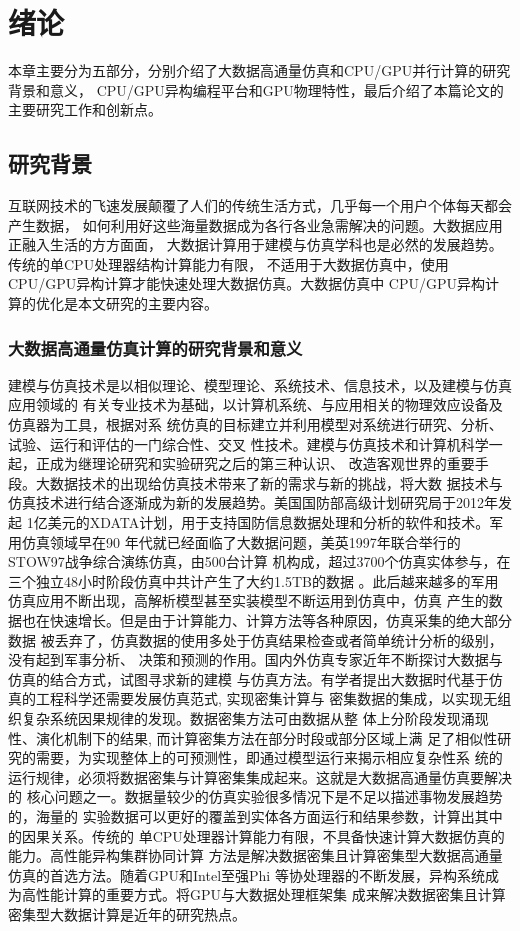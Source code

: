 \chapter{绪论}
本章主要分为五部分，分别介绍了大数据高通量仿真和CPU/GPU并行计算的研究背景和意义，
CPU/GPU异构编程平台和GPU物理特性，最后介绍了本篇论文的主要研究工作和创新点。

\section{研究背景}
互联网技术的飞速发展颠覆了人们的传统生活方式，几乎每一个用户个体每天都会产生数据，
如何利用好这些海量数据成为各行各业急需解决的问题。大数据应用正融入生活的方方面面，
大数据计算用于建模与仿真学科也是必然的发展趋势。传统的单CPU处理器结构计算能力有限，
不适用于大数据仿真中，使用CPU/GPU异构计算才能快速处理大数据仿真。大数据仿真中
CPU/GPU异构计算的优化是本文研究的主要内容。

\subsection{大数据高通量仿真计算的研究背景和意义}
建模与仿真技术是以相似理论、模型理论、系统技术、信息技术，以及建模与仿真应用领域的
有关专业技术为基础，以计算机系统、与应用相关的物理效应设备及仿真器为工具，根据对系
统仿真的目标建立并利用模型对系统进行研究、分析、试验、运行和评估的一门综合性、交叉
性技术。建模与仿真技术和计算机科学一起，正成为继理论研究和实验研究之后的第三种认识、
改造客观世界的重要手段。大数据技术的出现给仿真技术带来了新的需求与新的挑战，将大数
据技术与仿真技术进行结合逐渐成为新的发展趋势。美国国防部高级计划研究局于2012年发起
1亿美元的XDATA计划，用于支持国防信息数据处理和分析的软件和技术。军用仿真领域早在90
年代就已经面临了大数据问题，美英1997年联合举行的STOW97战争综合演练仿真，由500台计算
机构成，超过3700个仿真实体参与，在三个独立48小时阶段仿真中共计产生了大约1.5TB的数据
。此后越来越多的军用仿真应用不断出现，高解析模型甚至实装模型不断运用到仿真中，仿真
产生的数据也在快速增长。但是由于计算能力、计算方法等各种原因，仿真采集的绝大部分数据
被丢弃了，仿真数据的使用多处于仿真结果检查或者简单统计分析的级别，没有起到军事分析、
决策和预测的作用。国内外仿真专家近年不断探讨大数据与仿真的结合方式，试图寻求新的建模
与仿真方法。有学者提出大数据时代基于仿真的工程科学还需要发展仿真范式, 实现密集计算与
密集数据的集成，以实现无组织复杂系统因果规律的发现。数据密集方法可由数据从整
体上分阶段发现涌现性、演化机制下的结果, 而计算密集方法在部分时段或部分区域上满
足了相似性研究的需要，为实现整体上的可预测性，即通过模型运行来揭示相应复杂性系
统的运行规律，必须将数据密集与计算密集集成起来。这就是大数据高通量仿真要解决的
核心问题之一。数据量较少的仿真实验很多情况下是不足以描述事物发展趋势的，海量的
实验数据可以更好的覆盖到实体各方面运行和结果参数，计算出其中的因果关系。传统的
单CPU处理器计算能力有限，不具备快速计算大数据仿真的能力。高性能异构集群协同计算
方法是解决数据密集且计算密集型大数据高通量仿真的首选方法。随着GPU和Intel至强Phi
等协处理器的不断发展，异构系统成为高性能计算的重要方式。将GPU与大数据处理框架集
成来解决数据密集且计算密集型大数据计算是近年的研究热点。


